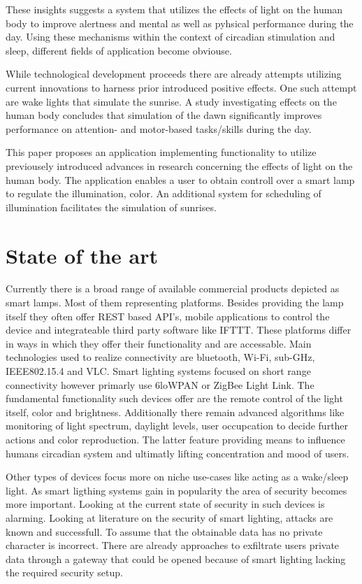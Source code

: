 \documentclass[conference]{IEEEtran}
\begin{document}
These insights suggests a system that utilizes the effects of light on the human body to improve alertness and mental as well as
pyhsical performance during the day. Using these mechanisms within the context of circadian stimulation and sleep, different
fields of application become obviouse.

While technological development proceeds there are already attempts utilizing current innovations to harness prior introduced 
positive effects. One such attempt are wake lights that simulate the sunrise. A study investigating effects on the human body
concludes that simulation of the dawn significantly improves performance on attention- and motor-based tasks/skills during the day.
\cite{Gabel2015a}

This paper proposes an application implementing functionality to utilize previousely introduced advances in research 
concerning the effects of light on the human body. The application enables a user to obtain controll over a smart lamp
to regulate the illumination, color. An additional system for scheduling of illumination facilitates the simulation of sunrises.

\section{State of the art}
Currently there is a broad range of available commercial products depicted as smart lamps. Most of them representing platforms.
Besides providing the lamp itself they often offer REST based API's, mobile applications to control the device and integrateable
third party software like IFTTT. These platforms differ in ways in which they offer their functionality and are accessable.
Main technologies used to realize connectivity are bluetooth, Wi-Fi, sub-GHz, IEEE802.15.4 and VLC. Smart lighting systems
focused on short range connectivity however primarly use 6loWPAN or ZigBee Light Link. The fundamental functionality such
devices offer are the remote control of the light itself, color and brightness. Additionally there remain advanced algorithms
like monitoring of light spectrum, daylight levels, user occupcation to decide further actions and color reproduction. The latter
feature providing means to influence humans circadian system and ultimatly lifting concentration and mood of users.\cite{higuera2018} 

Other types of devices focus more on niche use-cases like \cite{nur2018,philips19} acting as a wake/sleep light. As smart ligthing
systems gain in popularity the area of security becomes more important. Looking at the current state of security in such devices is
alarming. Looking at literature on the security of smart lighting, attacks are known and successfull. \cite{Morgner2017,Eichelberger2015} 
To assume that the obtainable data has no private character is incorrect. There are already approaches to exfiltrate 
users private data through a gateway that could be opened because of smart lighting lacking the required security setup. \cite{Maiti2018}
\end{document}
